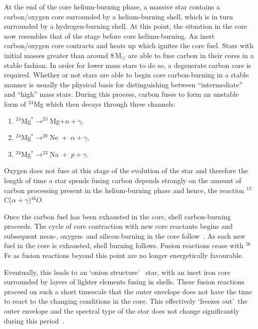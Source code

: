 At the end of the core helium-burning phase, a massive star contains a carbon/oxygen core surrounded by a helium-burning shell, which is in turn surrounded by a hydrogen-burning shell.
At this point, the situation in the core now resembles that of the stage before core helium-burning.
An inert carbon/oxygen core contracts and heats up which ignites the core fuel.
Stars with initial masses greater than around 8\,M$_{\odot}$ are able to fuse carbon in their cores in a stable fashion.
In order for lower mass stars to do so, a degenerate carbon core is required.
Whether or not stars are able to begin core carbon-burning in a stable manner is usually the physical basis for distinguishing between ``intermediate'' and ``high'' mass stars.
During this process, carbon fuses to form an unstable form of $^{24}$Mg which then decays through three channels:

\begin{enumerate}
    \item $^{24}$Mg$^{*}\rightarrow ^{23}$Mg$+n+\gamma$,
    \item $^{24}$Mg$^{*}\rightarrow ^{20}$Ne~+~$\alpha+\gamma$,
    \item $^{24}$Mg$^{*}\rightarrow ^{23}$Na~+~$p+\gamma$.
\end{enumerate}

Oxygen does not fuse at this stage of the evolution of the star and therefore the length of time a star spends fusing carbon depends strongly on the amount of carbon processing present in the helium-burning phase and hence, the reaction $^{12}$C($\alpha+\gamma$)$^{16}O$.

Once the carbon fuel has been exhausted in the core, shell carbon-burning proceeds.
The cycle of core contraction with new core reactants begins and subsequent neon-, oxygen- and silicon-burning in the core follow~\citep{Woosley02}.
As each new fuel in the core is exhausted, shell burning follows.
Fusion reactions cease with $^{56}$Fe as fusion reactions beyond this point are no longer energetically favourable.

Eventually, this leads to an \textquoteleft onion structure\textquoteright
~star, with an inert iron core surrounded by layers of lighter elements fusing in shells.
These fusion reactions proceed on such a short timescale that the outer envelope does not have the time to react to the changing conditions in the core.
This effectively \textquoteleft freezes out\textquoteright ~the outer envelope and the spectral type of the star does not change significantly during this period~\citep{Meynet11}.

